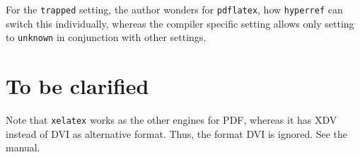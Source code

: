 \documentclass[a4paper, english]{article}%
\newcommand{\pdflatex}{\texttt{pdflatex}}
\newcommand{\xelatex}{\texttt{xelatex}}
\begin{document}
For the \texttt{trapped} setting, the author wonders for \pdflatex, 
how \texttt{hyperref} can switch this individually, whereas the compiler specific setting 
allows only setting to \texttt{unknown} 
in conjunction with other settings. 


\section{To be clarified}\label{sec:TBC}

Note that \xelatex{} works as the other engines for PDF, 
whereas it has XDV instead of DVI as alternative format. 
Thus, the format DVI is ignored. 
See the manual. 



{}%
\end{document}
